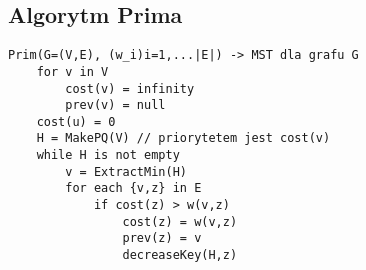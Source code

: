 \documentclass{article}
\numberwithin{equation}{subsection}
\begin{document}
\subsection{Algorytm Prima}

\begin{verbatim}
Prim(G=(V,E), (w_i)i=1,...|E|) -> MST dla grafu G
    for v in V 
        cost(v) = infinity
        prev(v) = null
    cost(u) = 0
    H = MakePQ(V) // priorytetem jest cost(v)
    while H is not empty
        v = ExtractMin(H)
        for each {v,z} in E
            if cost(z) > w(v,z)
                cost(z) = w(v,z)
                prev(z) = v
                decreaseKey(H,z)
\end{verbatim}
\end{document}
